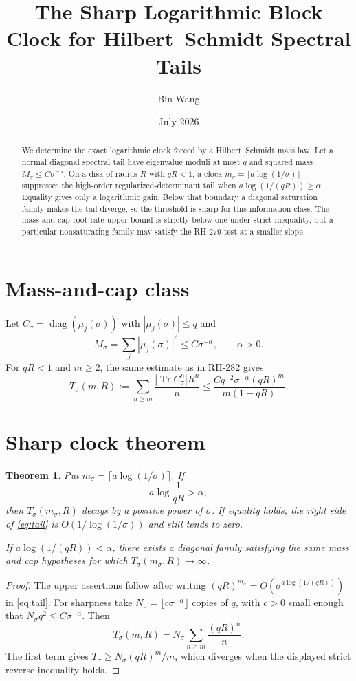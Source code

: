 \documentclass[11pt]{article}
\title{The Sharp Logarithmic Block Clock for Hilbert--Schmidt Spectral Tails}
\author{Bin Wang}\date{July 2026}
\newtheorem{theorem}{Theorem}[section]
\theoremstyle{remark}\newtheorem{remark}[theorem]{Remark}
\begin{document}
\maketitle
\begin{abstract}
We determine the exact logarithmic clock forced by a Hilbert--Schmidt mass
law.  Let a normal diagonal spectral tail have eigenvalue moduli at most $q$
and squared mass $M_\sigma\le C\sigma^{-\alpha}$.  On a disk of radius $R$
with $qR<1$, a clock $m_\sigma=\lceil a\log(1/\sigma)\rceil$ suppresses the
high-order regularized-determinant tail when
$a\log(1/(qR))\ge\alpha$.  Equality gives only a logarithmic gain.  Below
that boundary a diagonal saturation family makes the tail diverge, so the
threshold is sharp for this information class.  The mass-and-cap root-rate
upper bound is strictly below one under strict inequality, but a particular
nonsaturating family may satisfy the RH-279 test at a smaller slope.
\end{abstract}

\section{Mass-and-cap class}
Let $C_\sigma=\operatorname{diag}(\mu_j(\sigma))$ with
$|\mu_j(\sigma)|\le q$ and
\[
 M_\sigma=\sum_j|\mu_j(\sigma)|^2\le C\sigma^{-\alpha},
 \qquad \alpha>0.
\]
For $qR<1$ and $m\ge2$, the same estimate as in RH-282 gives
\begin{equation}\label{eq:tail}
 T_\sigma(m,R):=
 \sum_{n\ge m}\frac{|\operatorname{Tr}C_\sigma^n|R^n}{n}
 \le\frac{Cq^{-2}\sigma^{-\alpha}(qR)^m}
 {m(1-qR)}.
\end{equation}

\section{Sharp clock theorem}
\begin{theorem}\label{thm:clock}
Put $m_\sigma=\lceil a\log(1/\sigma)\rceil$.  If
\[
 a\log\frac1{qR}>\alpha,
\]
then $T_\sigma(m_\sigma,R)$ decays by a positive power of $\sigma$.  If
equality holds, the right side of \eqref{eq:tail} is
$O(1/\log(1/\sigma))$ and still tends to zero.

If $a\log(1/(qR))<\alpha$, there exists a diagonal family satisfying the
same mass and cap hypotheses for which $T_\sigma(m_\sigma,R)\to\infty$.
\end{theorem}
\begin{proof}
The upper assertions follow after writing
$(qR)^{m_\sigma}=O(\sigma^{a\log(1/(qR))})$ in \eqref{eq:tail}.
For sharpness take
$N_\sigma=\lfloor c\sigma^{-\alpha}\rfloor$ copies of $q$, with $c>0$
small enough that $N_\sigma q^2\le C\sigma^{-\alpha}$.  Then
\[
 T_\sigma(m,R)=N_\sigma\sum_{n\ge m}\frac{(qR)^n}{n}.
\]
The first term gives
$T_\sigma\ge N_\sigma(qR)^m/m$, which diverges when the displayed strict
reverse inequality holds.
\end{proof}
\end{document}
